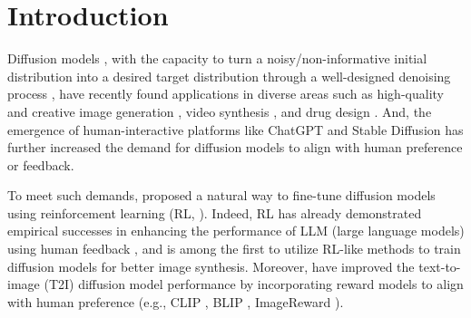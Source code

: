 \documentclass{article}
\theoremstyle{plain}
\theoremstyle{definition}
\theoremstyle{remark}
\begin{document}
\section{Introduction} 
Diffusion models \cite{sohl2015deep}, with the capacity to turn a noisy/non-informative initial distribution into a desired target distribution through a well-designed denoising process \cite{Ho20DDPM,DDIM,Song20SGMbySDE}, have recently 
found applications in diverse areas such as high-quality and creative image generation
\cite{DALLE2,DALLE3,Imagen,StableDiffusion}, 
video synthesis \cite{ho2022imagen-video}, and drug design \cite{xu2022geodiff}.
And, the emergence of human-interactive platforms like ChatGPT \cite{ouyang2022training} and Stable Diffusion \cite{StableDiffusion} has further increased the demand for diffusion models to align with human preference or feedback.

To meet such demands, \cite{hao2022optimizing} proposed a natural way to fine-tune diffusion models using reinforcement learning (RL, \cite{sutton2018reinforcement}). Indeed,  RL has already demonstrated empirical successes in enhancing the performance of LLM (large language models) using human feedback \cite{ christiano2017deep, ouyang2022training,bubeck2023sparks}, and \cite{fan2023optimizing} is among the first to utilize RL-like methods to train diffusion models for better image synthesis. Moreover, \cite{lee2023aligning,DPOK,DDPO} have improved the text-to-image (T2I) diffusion model performance by incorporating reward models to align with human preference (e.g., CLIP \cite{CLIP}, BLIP \cite{BLIP}, ImageReward \cite{ImageReward}).
\end{document}
